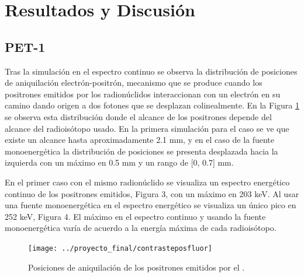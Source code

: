 \documentclass[12pt,a4paper,onecolumn]{article}
\begin{document}
\section{Resultados y Discusión}
\subsection*{PET-1}
Tras la simulación en el espectro continuo se observa la distribución de posiciones de aniquilación electrón-positrón, mecanismo que se produce cuando los positrones emitidos por los radionúclidos interaccionan con un electrón en su camino dando origen a dos fotones que se desplazan colinealmente. En la Figura \ref{fig:contrasteposfluor} se observa esta distribución donde el alcance de los positrones depende del alcance del radioisótopo usado. En la primera simulación para el caso   se ve que existe un alcance hasta aproximadamente 2.1 mm, y en el caso de la fuente monoenergética la distribución de posiciones se presenta desplazada hacia la izquierda con un máximo en 0.5 mm y un rango de [0, 0.7] mm.

En el primer caso con el mismo radionúclido se visualiza un espectro energético continuo de los positrones emitidos, Figura 3, con un máximo en 203 keV. Al usar una fuente monoenergética en el espectro energético se visualiza un único pico en 252 keV, Figura 4. El máximo en el espectro continuo y usando la fuente monoenergética varía de acuerdo a la energía máxima de cada radioisótopo.
\begin{figure}[h]
	\centering
	\texttt{[image: ../proyecto\_final/contrasteposfluor]}
	\caption{Posiciones de aniquilación de los positrones emitidos por el .}
	\label{fig:contrasteposfluor}
\end{figure}
\end{document}
